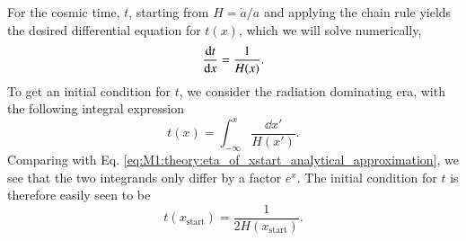 For the cosmic time, $t$, starting from $H=\dot{a}/a$ and applying the chain rule yields the desired differential equation for $t(x)$, which we will solve numerically, 
\begin{equation}
    \dv{t}{x} = \frac{1}{H(x)}. \label{eq:M1:theory:cosmic_time_ODE}
\end{equation}
To get an initial condition for $t$, we consider the radiation dominating era, with the following integral expression 
\begin{equation}
    t(x) = \int_{-\infty}^x \frac{\dd x'}{H(x')}. \label{eq:M1:theory:t_of_x_integral_expression}
\end{equation} 
%
Comparing with Eq. \eqref{eq:M1:theory:eta_of_xstart_analytical_approximation}, we see that the two integrands only differ by a factor $e^x$. The initial condition for $t$ is therefore easily seen to be  
\begin{equation}
    t(x_\mathrm{start}) = \frac{1}{2H(x_\mathrm{start})}. \label{eq:M1:theory:t_of_xstart_analytical_approximation}
\end{equation} 

